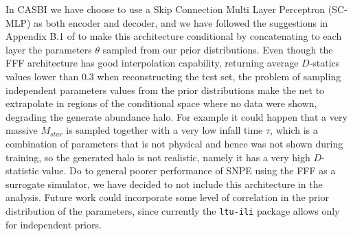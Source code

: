 In CASBI we have choose to use a Skip Connection Multi Layer Perceptron (SC-MLP) as both encoder and decoder, and we have followed the suggestions in Appendix B.1 of \cite{draxlerFreeformFlowsMake2024} to make this architecture conditional by concatenating to each layer the parameters $\theta$ sampled from our prior distributions.  
Even though the FFF architecture has good interpolation capability, returning average $D$-statics values lower than 0.3 when reconstructing the test set, the problem of sampling independent parameters values from the prior distributions make the net to extrapolate in regions of the conditional space where no data were shown, degrading the generate abundance halo. For example it could happen that a very massive $M_{star}$ is sampled together with a very low infall time $\tau$, which is a combination of parameters that is not physical and hence was not shown during training, so the generated halo is not realistic, namely it has a very high $D$-statistic value. Do to general poorer performance of SNPE using the FFF as a surrogate simulator, we have decided to not include this architecture in the analysis. Future work could incorporate some level of correlation in the prior distribution of the parameters, since currently the \texttt{ltu-ili} package allows only for independent priors.



